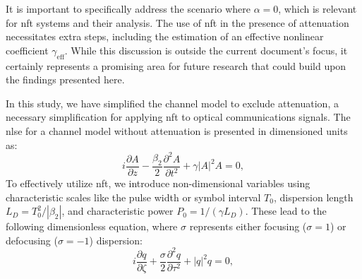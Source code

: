 It is important to specifically address the scenario where \(\alpha = 0\), which is relevant for \Gls{nft} systems and their analysis. The use of \gls{nft} in the presence of attenuation necessitates extra steps, including the estimation of an effective nonlinear coefficient \(\gamma_{\text{eff}}\). While this discussion is outside the current document's focus, it certainly represents a promising area for future research that could build upon the findings presented here.


In this study, we have simplified the channel model to exclude attenuation, a necessary simplification for applying \Gls{nft} to optical communications signals. The \Gls{nlse} for a channel model without attenuation is presented in dimensioned units as:
\begin{equation}
    i\frac{\partial A }{\partial z} - \frac{\beta_2}{2} \frac{\partial^2 A}{\partial t^2} + \gamma |A|^2 A = 0,
\label{eq:nlse}
\end{equation}
To effectively utilize \Gls{nft}, we introduce non-dimensional variables using characteristic scales like the pulse width or symbol interval \( T_0 \), dispersion length \( L_D = T_0^2/|\beta_2| \), and characteristic power \( P_0=1/(\gamma L_D) \). These lead to the following dimensionless equation, where \( \sigma \) represents either focusing (\( \sigma = 1 \)) or defocusing (\( \sigma = -1 \)) dispersion:
\begin{equation}
    i \frac{\partial q }{\partial \zeta} + \frac{\sigma}{2} \frac{\partial^2 q}{\partial \tau^2} +  |q|^2 q = 0,
\label{eq:nlse_norm}
\end{equation}






